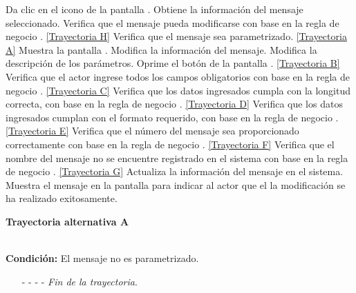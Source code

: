 	\begin{UCtrayectoria}
		\UCpaso[\UCactor] Da clic en el icono \editar de la pantalla .
		\UCpaso[\UCsist] Obtiene la información del mensaje seleccionado.
		\UCpaso[\UCsist] Verifica que el mensaje pueda modificarse con base en la regla de negocio . \hyperlink{CU9-2:TAH}{[Trayectoria H]}		
		\UCpaso[\UCsist] Verifica que el mensaje sea parametrizado. \hyperlink{CU9-2:TAA}{[Trayectoria A]}
		\UCpaso[\UCsist] Muestra la pantalla .
		\UCpaso[\UCactor] Modifica la información del mensaje. \label{CU9.2-P6}
		\UCpaso[\UCactor] Modifica la descripción de los parámetros.
		\UCpaso[\UCactor]Oprime el botón  de la pantalla . \label{CU9.2-P8} \hyperlink{CU9-2:TAB}{[Trayectoria B]}
		\UCpaso[\UCsist] Verifica que el actor ingrese todos los campos obligatorios con base en la regla de negocio . \hyperlink{CU9-2:TAC}{[Trayectoria C]}
		\UCpaso[\UCsist] Verifica que los datos ingresados cumpla con la longitud correcta, con base en la regla de negocio . \hyperlink{CU9-2:TAD}{[Trayectoria D]}
		\UCpaso[\UCsist] Verifica que los datos ingresados cumplan con el formato requerido, con base en la regla de negocio . \hyperlink{CU9-2:TAE}{[Trayectoria E]}
		\UCpaso[\UCsist] Verifica que el número del mensaje sea proporcionado correctamente con base en la regla de negocio . \hyperlink{CU9-2:TAF}{[Trayectoria F]}
		\UCpaso[\UCsist] Verifica que el nombre del mensaje no se encuentre registrado en el sistema con base en la regla de negocio . \hyperlink{CU9-2:TAG}{[Trayectoria G]} 
		\UCpaso[\UCsist] Actualiza la información del mensaje en el sistema.
		\UCpaso[\UCsist] Muestra el mensaje  en la pantalla  para indicar al actor que el la modificación se ha realizado exitosamente.
	\end{UCtrayectoria}		
\hypertarget{CU9-2:TAA}{\textbf{Trayectoria alternativa A}}\\
\noindent \textbf{Condición:} El mensaje no es parametrizado.
\begin{enumerate}
	\UCpaso[\UCsist] Muestra la pantalla .
	\UCpaso[\UCactor] Modifica la información del mensaje. \label{CU9.2-AP-2}
	\UCpaso[\UCsist] Continúa en el paso \ref{CU9.2-P8} de la trayectoria principal.
	\item[- -] - - {\em {Fin de la trayectoria}}.%
\end{enumerate}

